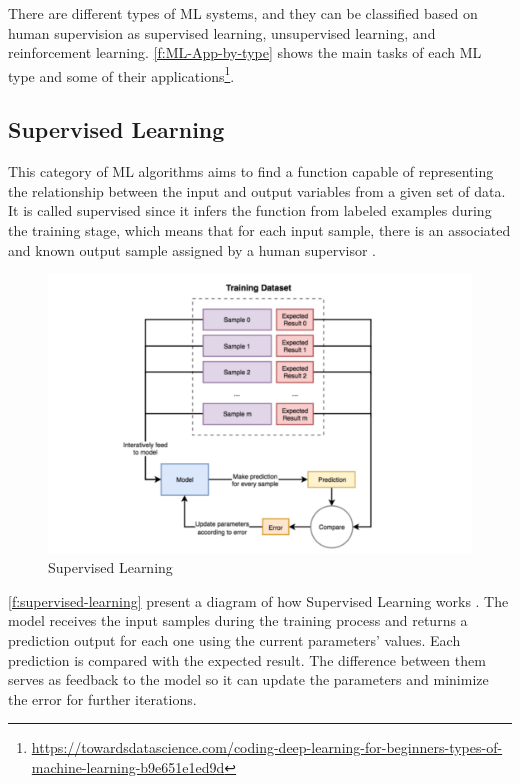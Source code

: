 There are different types of \ac{ML} systems, and they can be classified based on human supervision as supervised learning, unsupervised learning, and reinforcement learning. \autoref{f:ML-App-by-type} shows the main tasks of each \ac{ML} type and some of their applications\footnote{\url{https://towardsdatascience.com/coding-deep-learning-for-beginners-types-of-machine-learning-b9e651e1ed9d}}.

\subsection{Supervised Learning}
This category of \ac{ML} algorithms aims to find a function capable of representing the relationship between the input and output variables from a given set of data. It is called supervised since it infers the function from labeled examples during the training stage, which means that for each input sample, there is an associated and known output sample assigned by a human supervisor \cite{Batta2020}.

\begin{figure}[h]
\centering
\includegraphics[width=\linewidth]{figures/Ch2/Supervised-Learning.pdf}
\caption{Supervised Learning}
\label{f:supervised-learning}
\end{figure}

\autoref{f:supervised-learning} present a diagram of how Supervised Learning works%
. The model receives the input samples during the training process and returns a prediction output for each one using the current parameters' values. Each prediction is compared with the expected result. The difference between them serves as feedback to the model so it can update the parameters and minimize the error for further iterations.


